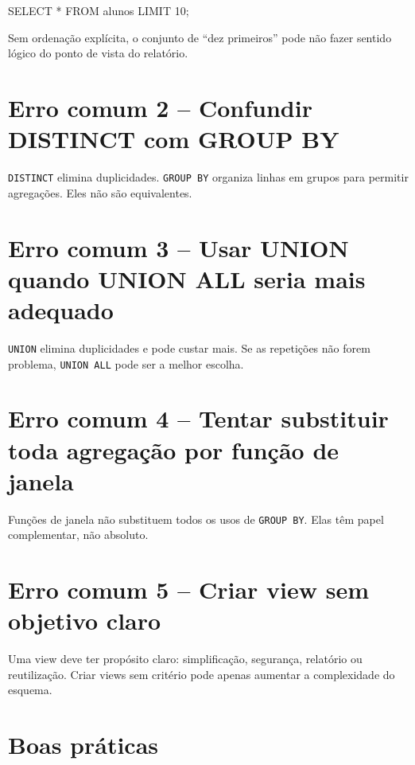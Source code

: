 \begin{sqlcode}
SELECT *
FROM alunos
LIMIT 10;
\end{sqlcode}

Sem ordenação explícita, o conjunto de “dez primeiros” pode não fazer sentido lógico do ponto de vista do relatório.

\section{Erro comum 2 -- Confundir DISTINCT com GROUP BY}

\texttt{DISTINCT} elimina duplicidades. \texttt{GROUP BY} organiza linhas em grupos para permitir agregações. Eles não são equivalentes.

\section{Erro comum 3 -- Usar UNION quando UNION ALL seria mais adequado}

\texttt{UNION} elimina duplicidades e pode custar mais. Se as repetições não forem problema, \texttt{UNION ALL} pode ser a melhor escolha.

\section{Erro comum 4 -- Tentar substituir toda agregação por função de janela}

Funções de janela não substituem todos os usos de \texttt{GROUP BY}. Elas têm papel complementar, não absoluto.

\section{Erro comum 5 -- Criar view sem objetivo claro}

Uma view deve ter propósito claro: simplificação, segurança, relatório ou reutilização. Criar views sem critério pode apenas aumentar a complexidade do esquema.

\section{Boas práticas}

